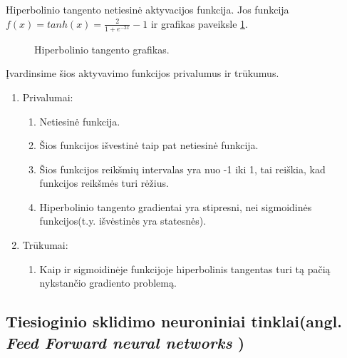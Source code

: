Hiperbolinio tangento netiesinė aktyvacijos funkcija. Jos funkcija $f(x)=tanh(x)=\frac{2}{1+e^{-2x}}-1$ ir grafikas paveiksle \ref{fig:tanh}.

\begin{figure}[h!]
  \centering
{}
\caption{Hiperbolinio tangento grafikas.}
\label{fig:tanh}
\end{figure}

Įvardinsime šios aktyvavimo funkcijos privalumus ir trūkumus. \cite{Avinash2017}
\begin{enumerate}
  \item Privalumai:
    \begin{enumerate}
      \item Netiesinė funkcija.
      \item Šios funkcijos išvestinė taip pat netiesinė funkcija.
      \item Šios funkcijos reikšmių intervalas yra nuo -1 iki 1, tai reiškia, kad funkcijos reikšmės turi rėžius.
      \item Hiperbolinio tangento gradientai yra stipresni, nei sigmoidinės funkcijos(t.y. išvėstinės yra statesnės).
    \end{enumerate}
  \item Trūkumai:
    \begin{enumerate}
      \item Kaip ir sigmoidinėje funkcijoje hiperbolinis tangentas turi tą pačią nykstančio gradiento problemą.
    \end{enumerate}
\end{enumerate}


\subsection{Tiesioginio sklidimo neuroniniai tinklai(angl. \textit{Feed Forward neural networks })}

